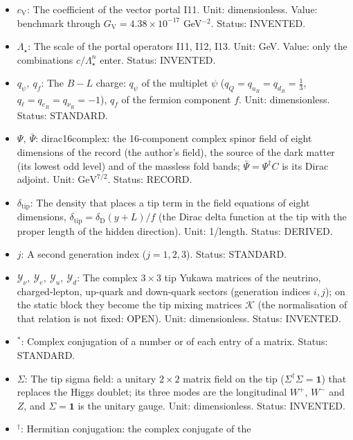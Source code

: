 \documentclass[
  10pt,
]{article}
\begin{document}
\begin{itemize}
\item
  \(c_{\mathrm{V}}\): The coefficient of the vector portal I11. Unit:
  dimensionless. Value: benchmark through
  \(G_{\mathrm{V}} = 4.38\times10^{-17}\) GeV\(^{-2}\). Status:
  INVENTED.
\item
  \(\Lambda_\star\): The scale of the portal operators I11, I12, I13.
  Unit: GeV. Value: only the combinations \(c/\Lambda_\star^n\) enter.
  Status: INVENTED.
\item
  \(q_\psi,\ q_f\): The \(B - L\) charge: \(q_\psi\) of the multiplet
  \(\psi\) (\(q_Q = q_{u_R} = q_{d_R} = \frac13\),
  \(q_\ell = q_{e_R} = q_{\nu_R} = -1\)), \(q_f\) of the fermion
  component \(f\). Unit: dimensionless. Status: STANDARD.
\item
  \(\Psi,\ \bar\Psi\): dirac16complex: the 16-component complex spinor
  field of eight dimensions of the record (the author's field), the
  source of the dark matter (its lowest odd level) and of the massless
  fold bands; \(\bar\Psi = \Psi^\dagger C\) is its Dirac adjoint. Unit:
  \(\mathrm{GeV}^{7/2}\). Status: RECORD.
\item
  \(\delta_{\mathrm{tip}}\): The density that places a tip term in the
  field equations of eight dimensions,
  \(\delta_{\mathrm{tip}} = \delta_{\mathrm{D}}(y + L)/f\) (the Dirac
  delta function at the tip with the proper length of the hidden
  direction). Unit: 1/length. Status: DERIVED.
\item
  \(j\): A second generation index (\(j = 1, 2, 3\)). Status: STANDARD.
\item
  \(\mathcal{Y}_\nu,\ \mathcal{Y}_e,\ \mathcal{Y}_u,\ \mathcal{Y}_d\):
  The complex \(3 \times 3\) tip Yukawa matrices of the neutrino,
  charged-lepton, up-quark and down-quark sectors (generation indices
  \(i, j\)); on the static block they become the tip mixing matrices
  \(\mathcal{K}\) (the normalisation of that relation is not fixed:
  OPEN). Unit: dimensionless. Status: INVENTED.
\item
  \({}^*\): Complex conjugation of a number or of each entry of a
  matrix. Status: STANDARD.
\item
  \(\Sigma\): The tip sigma field: a unitary \(2 \times 2\) matrix field
  on the tip (\(\Sigma^\dagger\Sigma = \mathbf{1}\)) that replaces the
  Higgs doublet; its three modes are the longitudinal \(W^+\), \(W^-\)
  and \(Z\), and \(\Sigma = \mathbf{1}\) is the unitary gauge. Unit:
  dimensionless. Status: INVENTED.
\item
  \({}^\dagger\): Hermitian conjugation: the complex conjugate of the

\end{itemize}
\end{document}
